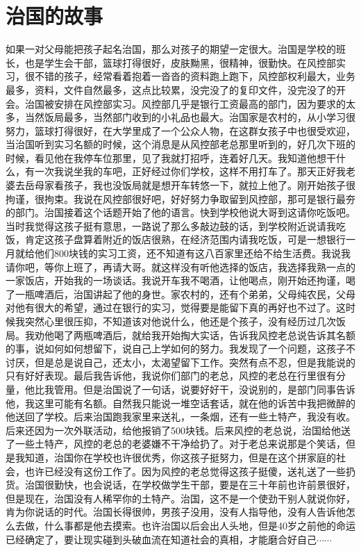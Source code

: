 \section{治国的故事}

如果一对父母能把孩子起名治国，那么对孩子的期望一定很大。治国是学校的班长，也是学生会干部，篮球打得很好，皮肤黝黑，很精神，很勤快。在风控部实习，很不错的孩子，经常看着抱着一沓沓的资料跑上跑下，风控部权利最大，业务最多，资料，文件自然最多，这点比较累，没完没了的复印文件，没完没了的开会。治国被安排在风控部实习。风控部几乎是银行工资最高的部门，因为要求的太多，当然饭局最多，当然部门收到的小礼品也最大。治国家是农村的，从小学习很努力，篮球打得很好，在大学里成了一个公众人物，在这群女孩子中也很受欢迎，当治国听到实习名额的时候，这个消息是从风控部老总那里听到的，好几次下班的时候，看见他在我停车位那里，见了我就打招呼，连着好几天。我知道他想干什么，有一次我说坐我的车吧，正好经过你们学校，这样不用打车了。那天正好我老婆去岳母家看孩子，我也没饭局就是想开车转悠一下，就拉上他了。刚开始孩子很拘谨，很拘束。我说在风控部很好吧，好好努力争取留到风控部，那可是银行最夯的部门。治国接着这个话题开始了他的语言。快到学校他说大哥到这请你吃饭吧。当时我觉得这孩子挺有意思，一路说了那么多敲边鼓的话，到学校附近说请我吃饭，肯定这孩子盘算着附近的饭店很熟，在经济范围内请我吃饭，可是一想银行一月就给他们800块钱的实习工资，还不知道有这八百家里还给不给生活费。我说我请你吧，等你上班了，再请大哥。就这样没有听他选择的饭店，我选择我熟一点的一家饭店，开始我的一场谈话。我说开车我不喝酒，让他喝点，刚开始还拘谨，喝了一瓶啤酒后，治国讲起了他的身世。家农村的，还有个弟弟，父母纯农民，父母对他有很大的希望，通过在银行的实习，觉得要是能留下真的再好也不过了。这时候我突然心里很压抑，不知道该对他说什么，他还是个孩子，没有经历过几次饭局。我劝他喝了两瓶啤酒后，就给我开始掏大实话，告诉我风控老总说告诉其名额的事，说如何如何想留下，说自己上学如何的努力。我发现了一个问题，这孩子不讨厌，但是总是说自己，还太小，太渴望留下工作。突然有点不忍，但是我能说的只有好好表现。最后我告诉他，我说你们部门的老总，风控的老总在行里很有分量，他比我管用。但是治国说了一句话，说要好好干，没说别的，是部门同事告诉他，我这里可能有名额。自然我只能说一堆空话套话，就在他的诉苦中我把微醉的他送回了学校。后来治国跑我家里来送礼，一条烟，还有一些土特产，我没有收。后来还因为一次外联活动，给他报销了500块钱。后来风控的老总说，治国给他送了一些土特产，风控的老总的老婆嫌不干净给扔了。对于老总来说那是个笑话，但是我知道，治国你在学校也许很优秀，你这孩子挺努力，但是在这个拼家庭的社会，也许已经没有这份工作了。因为风控的老总觉得这孩子挺傻，送礼送了一些扔货。治国很勤快，也会说话，在学校做学生干部，要是在三十年前也许前景很好，但是现在，治国没有人稀罕你的土特产。治国，这不是一个使劲干别人就说你好，肯为你说话的时代。治国长得很帅，男孩子没用，没有人指导他，没有人告诉他怎么去做，什么事都是他去摸索。也许治国以后会出人头地，但是40岁之前他的命运已经确定了，要让现实碰到头破血流在知道社会的真相，才能磨合好自己$\cdots\cdots$


